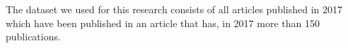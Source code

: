 \documentclass[../../Thesis.tex]{subfiles}
\begin{document}
The dataset we used for this research consists of all articles published in 2017 which have been published in an article that has, in 2017 more than 150 publications.
\end{document}
